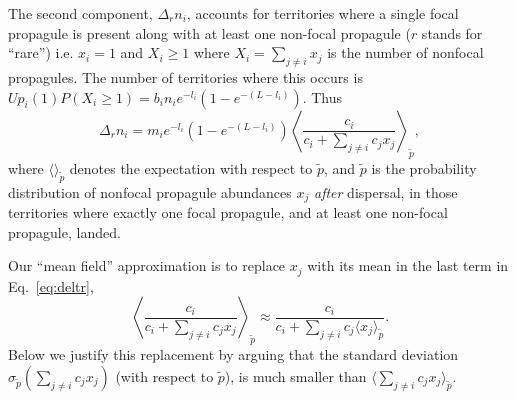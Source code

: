 \documentclass[11pt]{article}
\begin{document}
The second component, $\Delta_r n_i$, accounts for territories where a single focal propagule is present along with at least one non-focal propagule ($r$ stands for ``rare'') i.e. $x_i=1$ and $X_i\geq 1$ where $X_i=\sum_{j\neq i} x_j$ is the number of nonfocal propagules. The number of territories where this occurs is $Up_i(1)P(X_i\geq 1)=b_i n_i e^{-l_i}(1-e^{-(L-l_i)})$. Thus 
\begin{equation}
\Delta_r n_i = m_i e^{-l_i}(1-e^{-(L-l_i)})\left\langle  \frac{c_i}{c_i +\sum_{j\neq i} c_j x_j } \right\rangle_{\tilde{p}},  \label{eq:deltr}
\end{equation}
where $\langle \rangle_{\tilde{p}}$ denotes the expectation with respect to $\tilde{p}$, and $\tilde{p}$ is the probability distribution of nonfocal propagule abundances $x_j$ \textit{after} dispersal, in those territories where exactly one focal propagule, and at least one non-focal propagule, landed. 

Our ``mean field'' approximation is to replace $x_j$ with its mean in the last term in Eq.~\eqref{eq:deltr},
\begin{equation}
\left\langle\frac{c_i}{c_i +\sum_{j\neq i} c_j x_j}\right\rangle_{\tilde{p}}\approx \frac{c_i}{c_i +\sum_{j\neq i} c_j \langle x_j\rangle_{\tilde{p}}}.\label{eq:meanfieldr}
\end{equation}
Below we justify this replacement by arguing that the standard deviation $\sigma_{\tilde{p}}(\sum_{j\neq i} c_j x_j)$ (with respect to $\tilde{p}$), is much smaller than $\langle\sum_{j\neq i} c_j x_j\rangle_{\tilde{p}}$.
\end{document}
